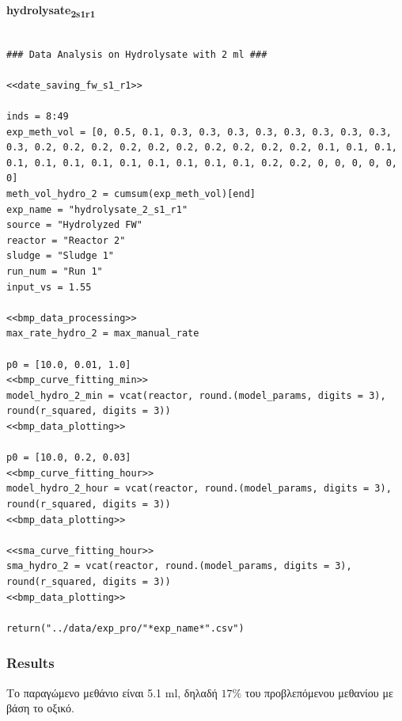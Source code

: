 \documentclass[11pt]{article}
\begin{document}
\textbf{hydrolysate\textsubscript{2}\textsubscript{s1}\textsubscript{r1}}
\begin{verbatim}

### Data Analysis on Hydrolysate with 2 ml ###

<<date_saving_fw_s1_r1>>

inds = 8:49
exp_meth_vol = [0, 0.5, 0.1, 0.3, 0.3, 0.3, 0.3, 0.3, 0.3, 0.3, 0.3, 0.3, 0.2, 0.2, 0.2, 0.2, 0.2, 0.2, 0.2, 0.2, 0.2, 0.2, 0.1, 0.1, 0.1, 0.1, 0.1, 0.1, 0.1, 0.1, 0.1, 0.1, 0.1, 0.1, 0.2, 0.2, 0, 0, 0, 0, 0, 0]
meth_vol_hydro_2 = cumsum(exp_meth_vol)[end]
exp_name = "hydrolysate_2_s1_r1"
source = "Hydrolyzed FW"
reactor = "Reactor 2"
sludge = "Sludge 1"
run_num = "Run 1"
input_vs = 1.55

<<bmp_data_processing>>
max_rate_hydro_2 = max_manual_rate

p0 = [10.0, 0.01, 1.0]
<<bmp_curve_fitting_min>>
model_hydro_2_min = vcat(reactor, round.(model_params, digits = 3), round(r_squared, digits = 3))
<<bmp_data_plotting>>

p0 = [10.0, 0.2, 0.03]
<<bmp_curve_fitting_hour>>
model_hydro_2_hour = vcat(reactor, round.(model_params, digits = 3), round(r_squared, digits = 3))
<<bmp_data_plotting>>

<<sma_curve_fitting_hour>>
sma_hydro_2 = vcat(reactor, round.(model_params, digits = 3), round(r_squared, digits = 3))
<<bmp_data_plotting>>

return("../data/exp_pro/"*exp_name*".csv")
\end{verbatim}

\subsubsection{Results}
\label{sec:org2fc6dbf}
Το παραγώμενο μεθάνιο είναι 5.1 ml, δηλαδή \(17 \%\) του προβλεπόμενου μεθανίου με βάση το οξικό.
\end{document}
